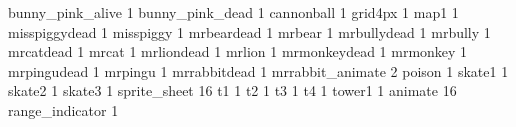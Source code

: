 bunny_pink_alive 1
bunny_pink_dead 1
cannonball 1
grid4px 1
map1 1
misspiggydead 1
misspiggy 1
mrbeardead 1
mrbear 1
mrbullydead 1
mrbully 1
mrcatdead 1
mrcat 1
mrliondead 1
mrlion 1
mrmonkeydead 1
mrmonkey 1
mrpingudead 1
mrpingu 1
mrrabbitdead 1
mrrabbit_animate 2
poison 1
skate1 1
skate2 1
skate3 1
sprite_sheet 16
t1 1
t2 1
t3 1
t4 1
tower1 1
animate 16
range_indicator 1

